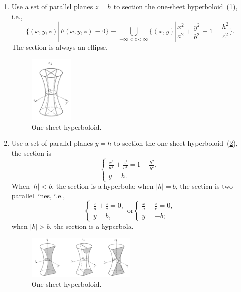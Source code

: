 \documentclass[11pt]{../../TexTemplate/elegantbook} %
\begin{document}
\begin{enumerate}[label=\roman*.]
    \item Use a set of parallel planes \(z=h\) to section the one-sheet hyperboloid~(\ref{fig:OneSheetHyperboloid}), i.e.,
        \[
        \{ (x,y,z) | F(x,y,z) = 0 \} = 
        \bigcup_{-\infty < z < \infty} \{ (x,y) | \frac{x^{2}}{a^{2}} + \frac{y^{2}}{b^{2}} = 1 + \frac{h^{2}}{c^{2}}\}.
        \]
        The section is always an ellipse.
        \begin{figure}[h]
            \centering
            \includegraphics[width=0.2\textwidth]{img/one-sheet-hyperboloid1.png}
            \caption{One-sheet hyperboloid.}
            \label{fig:OneSheetHyperboloid}
        \end{figure}
    \item Use a set of parallel planes \(y=h\) to section the one-sheet hyperboloid~(\ref{fig:OneSheetHyperboloid2}), 
        the section is
        \[
        \begin{cases} \frac{x^{2}}{a^{2}} + \frac{z^{2}}{c^{2}} = 1 - \frac{h^{2}}{b^{2}}, \\ y=h.  \end{cases}
        \]
        When \(|h| < b\), the section is a hyperbola;\newline
        when \(|h| = b\), the section is two parallel lines, i.e., 
        \[
        \begin{cases} \frac{x}{a}\pm \frac{z}{c} = 0, \\ y=b ,\end{cases}
        \text{or}
        \begin{cases} \frac{x}{a}\pm \frac{z}{c} = 0, \\ y=-b ;\end{cases}
        \]
        when \(|h| > b\), the section is a hyperbola.
        \begin{figure}[h]
            \centering
            \includegraphics[width=0.5\textwidth]{img/one-sheet-hyperboloid2.png}
            \caption{One-sheet hyperboloid.}
            \label{fig:OneSheetHyperboloid2}
        \end{figure}
\end{enumerate}
\end{document}

